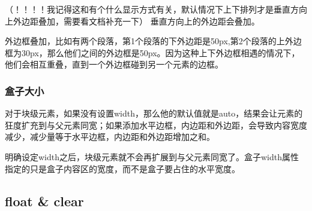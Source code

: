 （！！！！我记得这和有个什么显示方式有关，默认情况下上下排列才是垂直方向上外边距叠加，需要看文档补充一下）
垂直方向上的外边距会叠加。

外边框叠加，比如有两个段落，第1个段落的下外边距是50px,第2个段落的上外边框为30px，那么他们之间的外边框是50px。因为这种上下外边框相遇的情况下，他们会相互重叠，直到一个外边框碰到另一个元素的边框。

\subsubsection{盒子大小}

对于块级元素，如果没有设置width，那么他的默认值就是auto，结果会让元素的狂度扩充到与父元素同宽；如果添加水平边框，内边距和外边距，会导致内容宽度减少，减少量等于水平边框，内边距和外边距增加之和。

明确设定width之后，块级元素就不会再扩展到与父元素同宽了。盒子width属性指定的只是盒子内容区的宽度，而不是盒子要占住的水平宽度。


\subsection{float \& clear}

